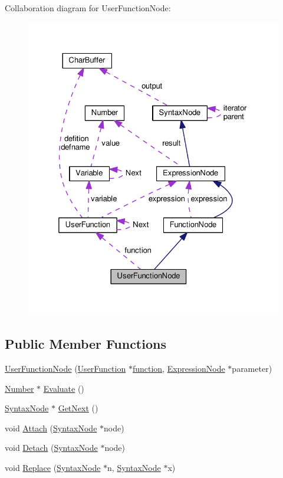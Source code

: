 Collaboration diagram for User\+Function\+Node\+:\nopagebreak
\begin{figure}[H]
\begin{center}
\leavevmode
\includegraphics[width=325pt]{classUserFunctionNode__coll__graph}
\end{center}
\end{figure}
\subsection*{Public Member Functions}
\begin{DoxyCompactItemize}
\item 
\hyperlink{classUserFunctionNode_af7a261eca3785022389cd02d36fa33d5}{User\+Function\+Node} (\hyperlink{classUserFunction}{User\+Function} $\ast$\hyperlink{classUserFunctionNode_aea2ba2bacd83f3cceb891b0b3e45580c}{function}, \hyperlink{classExpressionNode}{Expression\+Node} $\ast$parameter)
\item 
\hyperlink{structNumber}{Number} $\ast$ \hyperlink{classUserFunctionNode_a2efcbf95707c44463017973693c891db}{Evaluate} ()
\item 
\hyperlink{classSyntaxNode}{Syntax\+Node} $\ast$ \hyperlink{classUserFunctionNode_acc4c2efb6727a6aa8d216556434c8a27}{Get\+Next} ()
\item 
void \hyperlink{classUserFunctionNode_ab05c0002a4c62551813238bbdd5632a2}{Attach} (\hyperlink{classSyntaxNode}{Syntax\+Node} $\ast$node)
\item 
void \hyperlink{classUserFunctionNode_aec00fdd81b01b4257f1631771e50cf28}{Detach} (\hyperlink{classSyntaxNode}{Syntax\+Node} $\ast$node)
\item 
void \hyperlink{classUserFunctionNode_ad12ad72165eb03f17d7fbb1c2a80038b}{Replace} (\hyperlink{classSyntaxNode}{Syntax\+Node} $\ast$n, \hyperlink{classSyntaxNode}{Syntax\+Node} $\ast$x)
\end{DoxyCompactItemize}
